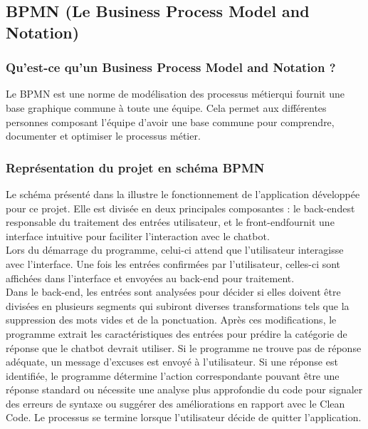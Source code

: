 \documentclass{rapport}
\begin{document}
\subsection{BPMN (Le Business Process Model and Notation)}
\subsubsection{Qu'est-ce qu'un Business Process Model and Notation ?}
Le BPMN est une norme de modélisation des processus métier\footnotemark[1] qui fournit une base graphique commune à toute une équipe. Cela permet aux différentes personnes composant l'équipe d'avoir une base commune pour comprendre, documenter et optimiser le processus métier. 
\subsubsection{Représentation du projet en schéma BPMN}
Le schéma présenté dans la  illustre le fonctionnement de l'application développée pour ce projet. Elle est divisée en deux principales composantes : le back-end\footnotemark[2] est responsable du traitement des entrées utilisateur, et le front-end\footnotemark[3] fournit une interface intuitive pour faciliter l'interaction avec le chatbot.\\

Lors du démarrage du programme, celui-ci attend que l'utilisateur interagisse avec l'interface. Une fois les entrées confirmées par l'utilisateur, celles-ci sont affichées dans l'interface et envoyées au back-end pour traitement. \\

Dans le back-end, les entrées sont analysées pour décider si elles doivent être divisées en plusieurs segments qui subiront diverses transformations tels que la suppression des mots vides et de la ponctuation. Après ces modifications, le programme extrait les caractéristiques des entrées pour prédire la catégorie de réponse que le chatbot devrait utiliser. Si le programme ne trouve pas de réponse adéquate, un message d'excuses est envoyé à l'utilisateur. Si une réponse est identifiée, le programme détermine l'action correspondante pouvant être une réponse standard ou nécessite une analyse plus approfondie du code pour signaler des erreurs de syntaxe ou suggérer des améliorations en rapport avec le Clean Code. Le processus se termine lorsque l'utilisateur décide de quitter l'application. \\
\newpage
{}
\end{document}

